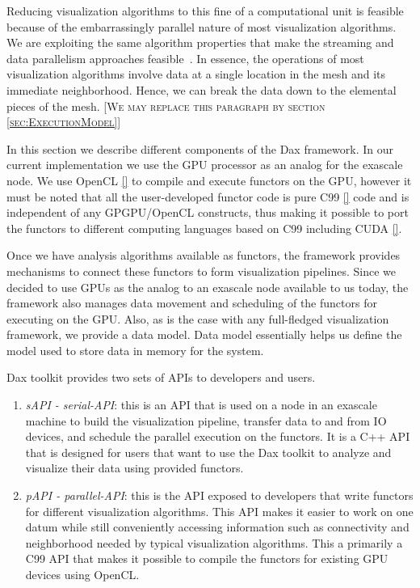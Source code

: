 \documentclass{vgtc}                          %
\newcommand*{\lcite}[1]{~\cite{#1}}
\newcommand{\sticky}[1]{{\color{red}\textsc{[#1]}}}
\begin{document}
Reducing visualization algorithms to this fine of a computational unit is
feasible because of the embarrassingly parallel nature of most
visualization algorithms.  We are exploiting the same algorithm properties
that make the streaming and data parallelism approaches
feasible\lcite{Ahrens00,Ahrens01}.  In essence, the operations of most
visualization algorithms involve data at a single location in the mesh and
its immediate neighborhood.  Hence, we can break the data down to the
elemental pieces of the mesh. 
\sticky{We may replace this paragraph by section \ref{sec:ExecutionModel}}

In this section we describe different components of the Dax framework. In our
current implementation we use the GPU processor as an analog for the exascale
node. We use OpenCL \ref{} to compile and execute functors on the GPU, however it must
be noted that all the user-developed functor code is pure C99 \ref{} code and
is independent of any GPGPU/OpenCL constructs, thus making it possible to port
the functors to different computing languages based on C99 including CUDA
\ref{}.

Once we have analysis algorithms available as functors, the framework provides 
mechanisms to connect these functors to form visualization pipelines. Since we
decided to use GPUs as the analog to an exascale node available to us today, the
framework also manages data movement and scheduling of the functors for
executing on the GPU. Also, as is the case with any full-fledged visualization
framework, we provide a data model. Data model essentially helps us
define the model used to store data in memory for the system. 

Dax toolkit provides two sets of APIs to developers and users.
\begin {enumerate}
\item \emph{sAPI - serial-API}: this is an API that is used on a node in an
exascale machine to build the visualization pipeline, transfer data to and from
IO devices, and schedule the parallel execution on the functors. It is a C++ API
that is designed for users that want to use the Dax toolkit to analyze and
visualize their data using provided functors.
\item \emph{pAPI - parallel-API}: this is the API exposed to developers that
write functors for different visualization algorithms. This API makes it easier
to work on one datum while still conveniently accessing information such as
connectivity and neighborhood needed by typical visualization algorithms. This a
primarily a C99 API that makes it possible to compile the functors for
existing GPU devices using OpenCL.
\end {enumerate}
\end{document}
